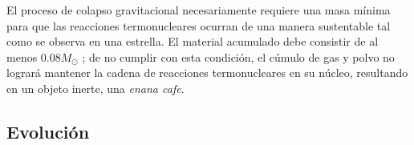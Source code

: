 
El proceso de colapso gravitacional necesariamente requiere una masa mínima para
que las reacciones termonucleares ocurran de una manera sustentable tal como se
observa en una estrella. El material acumulado debe consistir de al menos $0.08
M_{\odot}$ \citet*{anIntroStellarAstro::chapter2_stellarFormation}; de no
cumplir con esta condición, el cúmulo de gas y polvo no logrará mantener la
cadena de reacciones termonucleares en su núcleo, resultando en un objeto
inerte, una \textit{enana cafe}.

\subsection{Evolución}

